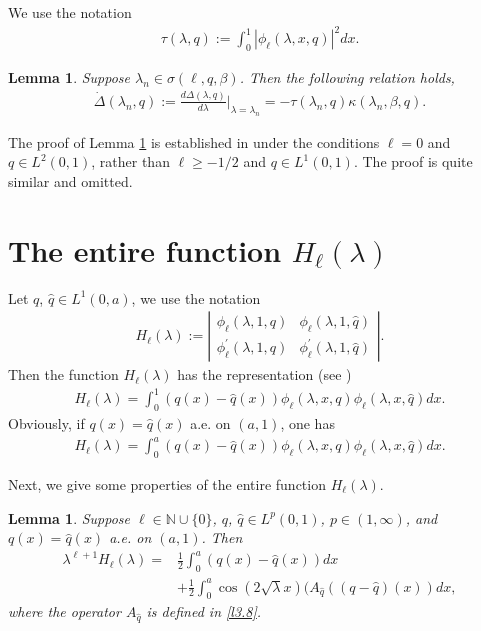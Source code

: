 \documentclass[reqno,12pt,centertags]{amsart}
\numberwithin{equation}{section}
\newtheorem{lemma}[theorem]{Lemma}
\theoremstyle{definition}
\begin{document}
We use the notation 
\begin{align*}
\tau(\lambda, q):=\int_0^1|\phi_{\ell}(\lambda, x, q)|^{2}dx.
\end{align*}

\begin{lemma}\label{l2.2}
Suppose  $\lambda_n\in\sigma(\ell, q, \beta)$. Then the following relation holds,
\begin{align*}
\dot{\Delta}(\lambda_n, q):=\frac{d\Delta(\lambda, q)}{d\lambda}\bigg|_{\lambda=\lambda_n}=
-\tau(\lambda_n, q)\kappa(\lambda_n, \beta, q).
\end{align*}
\end{lemma}

The proof of Lemma \ref{l2.2} is established in \cite[Lemma 1.1.1, p.7]{Guli2001} under the conditions $\ell=0$ and $q\in L^{2}(0,1)$, rather than $\ell\geq-1/2$ and $q\in L^{1}(0,1)$. The proof is quite similar and omitted.

\section{The entire function $H_{\ell}(\lambda)$}\label{s3}

Let $q$, $\hat{q} \in L^{1}(0, a)$, we use the notation
\begin{align*}
H_{\ell}(\lambda)
:=\left|\begin{array}{ll}
\phi_{\ell}(\lambda, 1, q) 
& \phi_{\ell}(\lambda, 1, \hat{q}) \\
\phi_{\ell}^{\prime}(\lambda, 1, q) 
& \phi_{\ell}^{\prime}(\lambda, 1, \hat{q})
\end{array}\right|.
\end{align*}
Then the function $H_{\ell}(\lambda)$ has the representation (see \cite[Lemma 3.2]{XYB2023})
\begin{align*}
H_{\ell}(\lambda)
=\int_0^1(q(x)-\hat{q}(x))\phi_{\ell}(\lambda, x, q) \phi_{\ell}(\lambda, x, \hat{q})dx.  
\end{align*}
Obviously, if $q(x)=\hat{q}(x)$ a.e. on $(a, 1)$, one has 
\begin{align}\label{e3.1}
H_{\ell}(\lambda)
=\int_0^a(q(x)-\hat{q}(x))\phi_{\ell}(\lambda, x, q)\phi_{\ell}(\lambda, x, \hat{q})dx. 
\end{align}


Next, we give some properties of the entire function $H_{\ell}(\lambda)$.

\begin{lemma}\cite[(4.3)]{XYB2023}\label{l3.1}
Suppose $\ell\in \mathbb{N}\cup\{0\}$, $q$, $\hat{q}\in L^p(0,1)$, $p\in(1,\infty)$, and $q(x)=\hat{q}(x)$ a.e. on $(a, 1)$. Then
\begin{equation}\label{l3.7}
\begin{split}
\lambda^{\ell+1} H_{\ell}(\lambda)
=&\frac{1}{2}\int_0^a(q(x)-\hat{q}(x))dx \\
&+\frac{1}{2}\int_0^a \cos(2\sqrt{\lambda}x)(A_{\hat{q}}((q-\hat{q})(x)) dx, 
\end{split}
\end{equation}
where the operator $A_{\hat{q}}$ is defined in \eqref{l3.8}.
\end{lemma}
\end{document}
